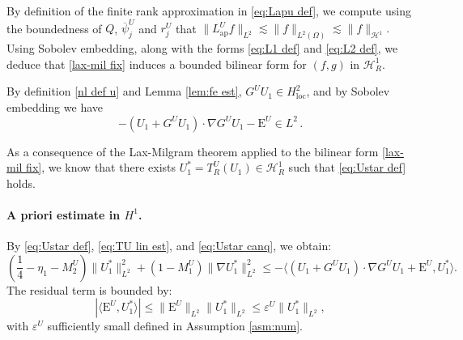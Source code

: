 \documentclass[11pt,a4paper]{article}
\numberwithin{equation}{section}
\newcommand{\Epsilon}{\mathrm{E}}
\newcommand{\tmop}[1]{\ensuremath{\operatorname{#1}}}
\begin{document}
By definition of the finite rank approximation in \eqref{eq:Lapu def}, we compute using the boundedness of $Q$, $\overline\psi_j^U$ and $r_j^U$ that $\|L_{\tmop{ap}}^{U}f\|_{L^2}\lesssim\|f\|_{L^2(\Omega)}\lesssim\|f\|_{\mathcal{H}^1}.$
Using Sobolev embedding, along with the forms \eqref{eq:L1 def} and \eqref{eq:L2 def}, we deduce that \eqref{lax-mil fix} induces a bounded bilinear form for $(f,g)$ in $\mathcal{H}^1_R$. 

By definition \eqref{nl def u} and Lemma \ref{lem:fe est}, $G^{U} U_1\in H^2_{\tmop{loc}}$, and by Sobolev embedding we have $$-(U_1 +
   G^{U} U_1) \cdot \nabla G^{U} U_1 - \Epsilon^U\in L^2\,.$$

As a consequence of the Lax-Milgram theorem applied to the bilinear form \eqref{lax-mil fix}, we know that there exists $U_1^{\ast}=T_R^U(U_1)\in\mathcal{H}^1_R$ such that \eqref{eq:Ustar def} holds.




     








\paragraph{A priori estimate in $H^1$.} 
By \eqref{eq:Ustar def}, \eqref{eq:TU lin est}, and \eqref{eq:Ustar canq}, we obtain:
\begin{equation}
  ( \frac{1}{4} - \eta_1 - M_2^U ) \| U_1^{\ast}
  \|_{L^2}^2 + (1 - M_1^U) \| \nabla U_1^{\ast} \|_{L^2}^2 \leqslant - \langle (U_1 +G^{U} U_1) \cdot \nabla G^{U} U_1 + \Epsilon^U,
  U_1^{\ast} \rangle . \label{eq:Ustar eq}
\end{equation}
The residual term is  bounded by:
\[ | \langle \Epsilon^U, U_1^{\ast} \rangle | \leqslant \| \Epsilon^U \|_{L^2} \|
   U^{\ast}_1 \|_{L^2} \leqslant \varepsilon^U \| U^{\ast}_1 \|_{L^2}, \]
with $\varepsilon^U$ sufficiently small defined in Assumption \ref{asm:num}. 
\end{document}
